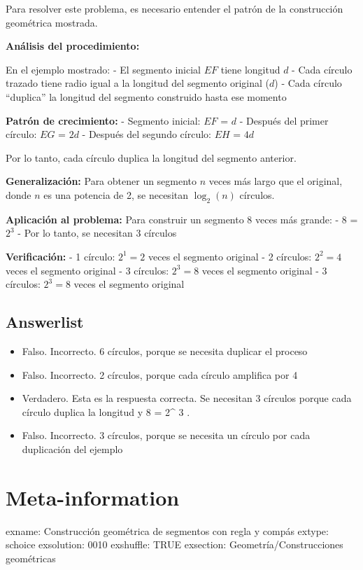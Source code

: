 \documentclass[
]{article}
\providecommand{\tightlist}{%
  \setlength{\itemsep}{0pt}\setlength{\parskip}{0pt}}
\begin{document}
Para resolver este problema, es necesario entender el patrón de la
construcción geométrica mostrada.

\textbf{Análisis del procedimiento:}

En el ejemplo mostrado: - El segmento inicial \(EF\) tiene longitud
\(d\) - Cada círculo trazado tiene radio igual a la longitud del
segmento original (\(d\)) - Cada círculo ``duplica'' la longitud del
segmento construido hasta ese momento

\textbf{Patrón de crecimiento:} - Segmento inicial: \(EF\) = \(d\) -
Después del primer círculo: \(EG\) = \(2d\) - Después del segundo
círculo: \(EH\) = \(4d\)

Por lo tanto, cada círculo duplica la longitud del segmento anterior.

\textbf{Generalización:} Para obtener un segmento \(n\) veces más largo
que el original, donde \(n\) es una potencia de 2, se necesitan
\(\log_2(n)\) círculos.

\textbf{Aplicación al problema:} Para construir un segmento 8 veces más
grande: - 8 = \(2^{3}\) - Por lo tanto, se necesitan 3 círculos

\textbf{Verificación:} - 1 círculo: \(2^1 = 2\) veces el segmento
original - 2 círculos: \(2^2 = 4\) veces el segmento original - 3
círculos: \(2^3 = 8\) veces el segmento original - 3 círculos:
\(2^{3} = 8\) veces el segmento original

\subsection{Answerlist}\label{answerlist-1}

\begin{itemize}
\tightlist
\item
  Falso. Incorrecto. 6 círculos, porque se necesita duplicar el proceso
\item
  Falso. Incorrecto. 2 círculos, porque cada círculo amplifica por 4
\item
  Verdadero. Esta es la respuesta correcta. Se necesitan 3 círculos
  porque cada círculo duplica la longitud y 8 = 2\^{} 3 .
\item
  Falso. Incorrecto. 3 círculos, porque se necesita un círculo por cada
  duplicación del ejemplo
\end{itemize}

\section{Meta-information}\label{meta-information}

exname: Construcción geométrica de segmentos con regla y compás extype:
schoice exsolution: 0010 exshuffle: TRUE exsection:
Geometría/Construcciones geométricas
\end{document}
